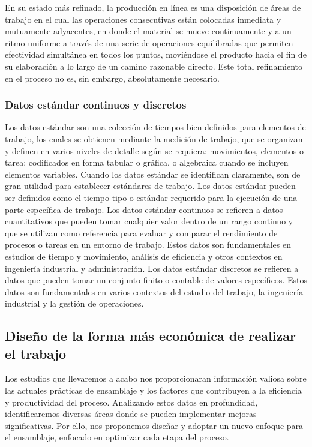 En su estado más refinado, la producción en línea es una disposición de áreas de trabajo en el cual las operaciones consecutivas están colocadas inmediata y mutuamente adyacentes, en donde el material se mueve continuamente y a un ritmo uniforme a través de una serie de operaciones equilibradas que permiten efectividad simultánea en todos los puntos, moviéndose el producto hacia el fin de su elaboración a lo largo de un camino razonable directo. Este total refinamiento en el proceso no es, sin embargo, absolutamente necesario. \cite{Balanceodelineas}
%
%
\subsubsection{Datos estándar continuos y discretos}

Los datos estándar son una colección de tiempos bien definidos para elementos de trabajo, los cuales se obtienen mediante la medición de trabajo, que se organizan y definen en varios niveles de detalle según se requiera: movimientos, elementos o tarea; codificados en forma tabular o gráfica, o algebraica cuando se incluyen elementos variables. Cuando los datos estándar se identifican claramente, son de gran utilidad para establecer estándares de trabajo. Los datos estándar pueden ser definidos como el tiempo tipo o estándar requerido para la ejecución de una parte específica de trabajo. \cite{Datosestandar}
\newline
Los datos estándar continuos se refieren a datos cuantitativos que pueden tomar cualquier valor dentro de un rango continuo y que se utilizan como referencia para evaluar y comparar el rendimiento de procesos o tareas en un entorno de trabajo. Estos datos son fundamentales en estudios de tiempo y movimiento, análisis de eficiencia y otros contextos en ingeniería industrial y administración.
\newline
Los datos estándar discretos se refieren a datos que pueden tomar un conjunto finito o contable de valores específicos. Estos datos son fundamentales en varios contextos del estudio del trabajo, la ingeniería industrial y la gestión de operaciones.
%
%
\subsection{Diseño de la forma más económica de realizar el trabajo}   

Los estudios que llevaremos a acabo nos proporcionaran información valiosa sobre las actuales prácticas de ensamblaje y los factores que contribuyen a la eficiencia y productividad del proceso. Analizando estos datos en profundidad, identificaremos diversas áreas donde se pueden implementar mejoras significativas. Por ello, nos proponemos diseñar y adoptar un nuevo enfoque para el ensamblaje, enfocado en optimizar cada etapa del proceso.
%    
%   
